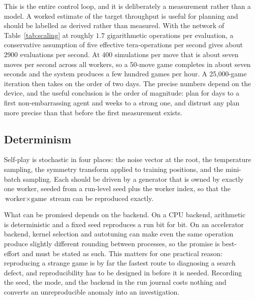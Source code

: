 This is the entire control loop, and it is deliberately a measurement rather than
a model. A worked estimate of the target throughput is useful for planning and
should be labelled as derived rather than measured. With the network of
Table~\ref{tab:scaling} at roughly $1.7$ gigarithmetic operations per evaluation,
a conservative assumption of five effective tera-operations per second gives
about $2900$ evaluations per second. At $400$ simulations per move that is about
seven moves per second across all workers, so a 50-move game completes in about
seven seconds and the system produces a few hundred games per hour. A
25{,}000-game iteration then takes on the order of two days. The precise numbers
depend on the device, and the useful conclusion is the order of magnitude: plan
for days to a first non-embarrassing agent and weeks to a strong one, and
distrust any plan more precise than that before the first measurement exists.

\subsection{Determinism}
\label{sec:determinism}

Self-play is stochastic in four places: the noise vector at the root, the
temperature sampling, the symmetry transform applied to training positions, and
the mini-batch sampling. Each should be driven by a generator that is owned by
exactly one worker, seeded from a run-level seed plus the worker index, so that
the $\text{worker} \times \text{game}$ stream can be reproduced exactly.

What can be promised depends on the backend. On a CPU backend, arithmetic is
deterministic and a fixed seed reproduces a run bit for bit. On an accelerator
backend, kernel selection and autotuning can make even the same operation produce
slightly different rounding between processes, so the promise is best-effort and
must be stated as such. This matters for one practical reason: reproducing a
strange game is by far the fastest route to diagnosing a search defect, and
reproducibility has to be designed in before it is needed. Recording the seed,
the mode, and the backend in the run journal costs nothing and converts an
unreproducible anomaly into an investigation.
